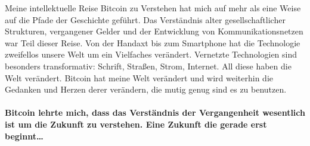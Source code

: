 Meine intellektuelle Reise Bitcoin zu Verstehen hat mich auf mehr als eine Weise
auf die Pfade der Geschichte geführt. Das Verständnis alter gesellschaftlicher
Strukturen, vergangener Gelder und der Entwicklung von Kommunikationsnetzen war
Teil dieser Reise. Von der Handaxt bis zum Smartphone hat die Technologie
zweifellos unsere Welt um ein Vielfaches verändert. Vernetzte Technologien sind
besonders transformativ: Schrift, Straßen, Strom, Internet. All diese haben
die Welt verändert. Bitcoin hat meine Welt verändert und wird weiterhin die
Gedanken und Herzen derer verändern, die mutig genug sind es zu benutzen.

\paragraph{Bitcoin lehrte mich, dass das Verständnis der Vergangenheit
wesentlich ist um die Zukunft zu verstehen. Eine Zukunft die gerade erst
beginnt\ldots}

%
%
%
%
%
